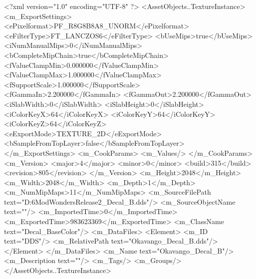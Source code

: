 <?xml version="1.0" encoding="UTF-8" ?>
<AssetObjects..TextureInstance>
	<m_ExportSettings>
		<ePixelformat>PF_R8G8B8A8_UNORM</ePixelformat>
		<eFilterType>FT_LANCZOS6</eFilterType>
		<bUseMips>true</bUseMips>
		<iNumManualMips>0</iNumManualMips>
		<bCompleteMipChain>true</bCompleteMipChain>
		<fValueClampMin>0.000000</fValueClampMin>
		<fValueClampMax>1.000000</fValueClampMax>
		<fSupportScale>1.000000</fSupportScale>
		<fGammaIn>2.200000</fGammaIn>
		<fGammaOut>2.200000</fGammaOut>
		<iSlabWidth>0</iSlabWidth>
		<iSlabHeight>0</iSlabHeight>
		<iColorKeyX>64</iColorKeyX>
		<iColorKeyY>64</iColorKeyY>
		<iColorKeyZ>64</iColorKeyZ>
		<eExportMode>TEXTURE_2D</eExportMode>
		<bSampleFromTopLayer>false</bSampleFromTopLayer>
	</m_ExportSettings>
	<m_CookParams>
		<m_Values/>
	</m_CookParams>
	<m_Version>
		<major>4</major>
		<minor>0</minor>
		<build>315</build>
		<revision>805</revision>
	</m_Version>
	<m_Height>2048</m_Height>
	<m_Width>2048</m_Width>
	<m_Depth>1</m_Depth>
	<m_NumMipMaps>11</m_NumMipMaps>
	<m_SourceFilePath text="D:\Civ6Mod\Terrain\NW\Natural Wonders\TM Release2\Okavango\Okavango_Decal_B.dds"/>
	<m_SourceObjectName text=""/>
	<m_ImportedTime>0</m_ImportedTime>
	<m_ExportedTime>983623369</m_ExportedTime>
	<m_ClassName text="Decal_BaseColor"/>
	<m_DataFiles>
		<Element>
			<m_ID text="DDS"/>
			<m_RelativePath text="Okavango_Decal_B.dds"/>
		</Element>
	</m_DataFiles>
	<m_Name text="Okavango_Decal_B"/>
	<m_Description text=""/>
	<m_Tags/>
	<m_Groups/>
</AssetObjects..TextureInstance>

